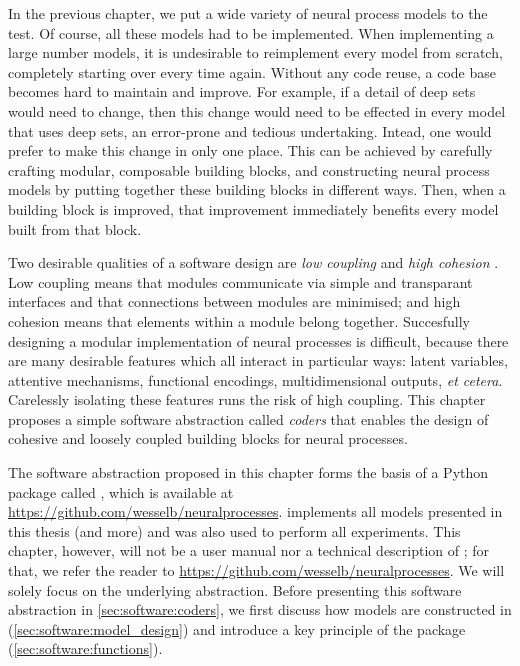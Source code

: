 \documentclass[12pt, twoside]{report}
\begin{document}
In the previous chapter, we put a wide variety of neural process models to the test.
Of course, all these models had to be implemented.
When implementing a large number models, it is undesirable to reimplement every model from scratch, completely starting over every time again.
Without any code reuse, a code base becomes hard to maintain and improve. 
For example, if a detail of deep sets would need to change, then this change would need to be effected in every model that uses deep sets, an error-prone and tedious undertaking.
Intead, one would prefer to make this change in only one place.
This can be achieved by carefully crafting modular, composable building blocks, and constructing neural process models by putting together these building blocks in different ways.
Then, when a building block is improved, that improvement immediately benefits every model built from that block.

Two desirable qualities of a software design are \emph{low coupling} and \emph{high cohesion} \parencite{Stevens:1974:Structured_Design}.
Low coupling means that modules communicate via simple and transparant interfaces
and that connections between modules are minimised;
and high cohesion means that elements within a module belong together.
Succesfully designing a modular implementation of neural processes is difficult, because there are many desirable features which all interact in particular ways: latent variables, attentive mechanisms, functional encodings, multidimensional outputs, \textit{et cetera}.
Carelessly isolating these features runs the risk of high coupling.
This chapter proposes a simple software abstraction called \emph{coders}
that enables the design of 
cohesive and loosely coupled building blocks for neural processes.

The software abstraction proposed in this chapter forms the basis of a Python \parencite{van_Rossum:1995:Python} package called  \parencite{Bruinsma:NeuralProcesses}, which is 
 available at \url{https://github.com/wesselb/neuralprocesses}.
 implements all models presented in this thesis (and more) and was also used to perform all experiments.
This chapter, however, will not be a user manual nor a technical description of ;
for that, we refer the reader to \url{https://github.com/wesselb/neuralprocesses}.
We will solely focus on the underlying abstraction.
Before presenting this software abstraction in \cref{sec:software:coders},
we first discuss how models are constructed in  (\cref{sec:software:model_design})
and introduce a key principle of the package (\cref{sec:software:functions}).
\end{document}
